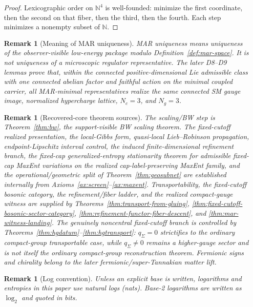 \documentclass[11pt]{article}
\newtheorem{remark}[theorem]{Remark}
\begin{document}
\begin{proof}
Lexicographic order on \(\mathbb N^4\) is well-founded: minimize the first coordinate, then the second on that fiber, then the third, then the fourth. Each step minimizes a nonempty subset of \(\mathbb N\).
\end{proof}

\begin{remark}[Meaning of MAR uniqueness]\label{rem:mar-uniqueness}
MAR uniqueness means uniqueness of the observer-visible low-energy package modulo Definition~\ref{def:mar-space}. It is not uniqueness of a microscopic regulator representative. The later D8--D9 lemmas prove that, within the connected positive-dimensional Lie admissible class with one connected abelian factor and faithful action on the minimal coupled carrier, all MAR-minimal representatives realize the same connected SM gauge image, normalized hypercharge lattice, \(N_c=3\), and \(N_g=3\).
\end{remark}

\begin{remark}[Recovered-core theorem sources]\label{ass:technical}
The scaling/BW step is Theorem~\ref{thm:bw}, the support-visible BW scaling theorem. The fixed-cutoff realized presentation, the local-Gibbs form, quasi-local Lieb--Robinson propagation, endpoint-Lipschitz interval control, the induced finite-dimensional refinement branch, the fixed-cap generalized-entropy stationarity theorem for admissible fixed-cap MaxEnt variations on the realized cap-label-preserving MaxEnt family, and the operational/geometric split of Theorem~\ref{thm:geosubnet} are established internally from Axioms~\ref{ax:screen}--\ref{ax:maxent}. Transportability, the fixed-cutoff bosonic category, the refinement/fiber ladder, and the realized compact-gauge witness are supplied by Theorems~\ref{thm:transport-from-gluing}, \ref{thm:fixed-cutoff-bosonic-sector-category}, \ref{thm:refinement-functor-fiber-descent}, and \ref{thm:mar-witness-landing}. The genuinely noncentral fixed-cutoff branch is controlled by Theorems~\ref{thm:hgdatum}--\ref{thm:hgtransport}: \(q_\Sigma=0\) strictifies to the ordinary compact-group transportable case, while \(q_\Sigma\ne0\) remains a higher-gauge sector and is not itself the ordinary compact-group reconstruction theorem. Fermionic signs and chirality belong to the later fermionic/super-Tannakian matter lift.
\end{remark}

\begin{remark}[Log convention]
Unless an explicit base is written, logarithms and entropies in this paper use natural logs (nats). Base-2 logarithms are written as \(\log_2\) and quoted in bits.
\end{remark}
\end{document}
